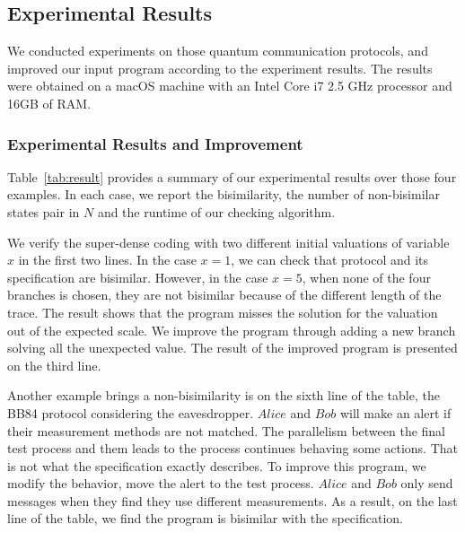 \documentclass[runningheads]{llncs}
\begin{document}
\subsection{Experimental Results}
We conducted experiments on those quantum communication protocols, and improved our input program according to the experiment results. The results were obtained on a macOS machine with an Intel Core i7 2.5 GHz processor and 16GB of RAM.
\subsubsection{Experimental Results and Improvement}Table~\ref{tab:result} provides a summary of our experimental results over those four examples. In each case, we report the bisimilarity, the number of non-bisimilar states pair in $N$ and the runtime of our checking algorithm.

We verify the super-dense coding with two different initial valuations of variable $x$ in the first two lines. In the case $x=1$, we can check that protocol and its specification are bisimilar. However, in the case $x=5$, when none of the four branches is chosen, they are not bisimilar because of the different length of the trace. The result shows that the program misses the solution for the valuation out of the expected scale. We improve the program through adding a new branch solving all the unexpected value. The result of the improved program is presented on the third line. 

Another example brings a non-bisimilarity is on the sixth line of the table, the BB84 protocol considering the eavesdropper. $Alice$ and $Bob$ will make an alert if their measurement methods are not matched. The parallelism between the final test process and them leads to the process continues behaving some actions. That is not what the specification exactly describes. To improve this program, we modify the behavior, move the alert to the test process. $Alice$ and $Bob$ only send messages when they find they use different measurements. As a result, on the last line of the table, we find the program is bisimilar with the specification.
\end{document}
